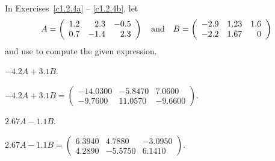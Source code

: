 \documentclass{ximera}
\begin{document}
\noindent In Exercises~\ref{c1.2.4a} -- \ref{c1.2.4b}, let 
\[
A = \left(\begin{array}{rrr} 1.2 & 2.3 & -0.5\\ 0.7 & -1.4 & 2.3
\end{array}\right) \quad\mbox{and}\quad
B = \left(\begin{array}{rrr} -2.9 & 1.23 & 1.6\\ -2.2 & 1.67 & 0
\end{array}\right)
\]
and use \Matlab to compute the given expression.
\begin{computerExercise}  \label{c1.2.4a}
$-4.2A+3.1B$.

\begin{solution}
\ans $-4.2A + 3.1B = \left(\begin{array}{rrr} 
-14.0300 & -5.8470 &    7.0600 \\
 -9.7600 & 11.0570 &   -9.6600\end{array}\right)$.

\end{solution}
\end{computerExercise}
\begin{computerExercise}  \label{c1.2.4b}
$2.67A-1.1B$.

\begin{solution}
\ans $2.67A - 1.1B = \left(\begin{array}{rrr} 
    6.3940  &  4.7880 &  -3.0950\\
    4.2890  & -5.5750 &   6.1410 \end{array}\right)$.




\end{solution}
\end{computerExercise}
\end{document}
